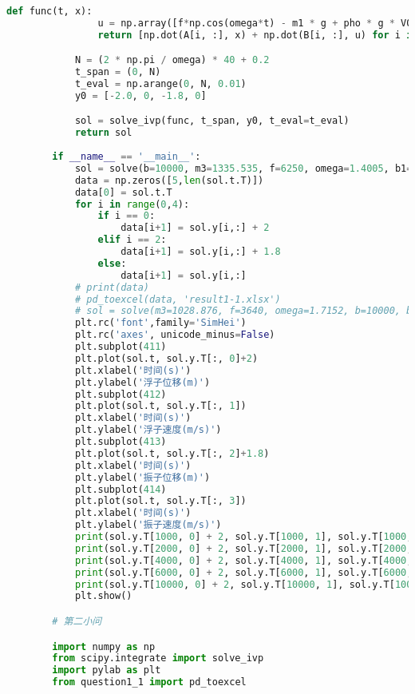 \documentclass[withoutpreface,bwprint]{cumcmthesis} %
\begin{document}
\begin{appendices}
\begin{lstlisting}[language=python]
            def func(t, x):
                u = np.array([f*np.cos(omega*t) - m1 * g + pho * g * V0 - k * x0, - m2 * g + k * x0])
                return [np.dot(A[i, :], x) + np.dot(B[i, :], u) for i in range(4)]

            N = (2 * np.pi / omega) * 40 + 0.2
            t_span = (0, N)
            t_eval = np.arange(0, N, 0.01)
            y0 = [-2.0, 0, -1.8, 0]

            sol = solve_ivp(func, t_span, y0, t_eval=t_eval)
            return sol
            
        if __name__ == '__main__':
            sol = solve(b=10000, m3=1335.535, f=6250, omega=1.4005, b1=656.3616)
            data = np.zeros([5,len(sol.t.T)])
            data[0] = sol.t.T
            for i in range(0,4):
                if i == 0:
                    data[i+1] = sol.y[i,:] + 2 
                elif i == 2:
                    data[i+1] = sol.y[i,:] + 1.8 
                else:
                    data[i+1] = sol.y[i,:]
            # print(data)
            # pd_toexcel(data, 'result1-1.xlsx')
            # sol = solve(m3=1028.876, f=3640, omega=1.7152, b=10000, b1=683.4558)
            plt.rc('font',family='SimHei')
            plt.rc('axes', unicode_minus=False)
            plt.subplot(411)
            plt.plot(sol.t, sol.y.T[:, 0]+2)
            plt.xlabel('时间(s)')
            plt.ylabel('浮子位移(m)')
            plt.subplot(412)
            plt.plot(sol.t, sol.y.T[:, 1])
            plt.xlabel('时间(s)')
            plt.ylabel('浮子速度(m/s)')
            plt.subplot(413)
            plt.plot(sol.t, sol.y.T[:, 2]+1.8)
            plt.xlabel('时间(s)')
            plt.ylabel('振子位移(m)')
            plt.subplot(414)
            plt.plot(sol.t, sol.y.T[:, 3])
            plt.xlabel('时间(s)')
            plt.ylabel('振子速度(m/s)')
            print(sol.y.T[1000, 0] + 2, sol.y.T[1000, 1], sol.y.T[1000, 2] + 1.8, sol.y.T[1000, 3])
            print(sol.y.T[2000, 0] + 2, sol.y.T[2000, 1], sol.y.T[2000, 2] + 1.8, sol.y.T[2000, 3])
            print(sol.y.T[4000, 0] + 2, sol.y.T[4000, 1], sol.y.T[4000, 2] + 1.8, sol.y.T[4000, 3])
            print(sol.y.T[6000, 0] + 2, sol.y.T[6000, 1], sol.y.T[6000, 2] + 1.8, sol.y.T[6000, 3])
            print(sol.y.T[10000, 0] + 2, sol.y.T[10000, 1], sol.y.T[10000, 2] + 1.8, sol.y.T[10000, 3])
            plt.show()

        # 第二小问

        import numpy as np
        from scipy.integrate import solve_ivp
        import pylab as plt
        from question1_1 import pd_toexcel
        

\end{lstlisting}
\end{appendices}
\end{document}
